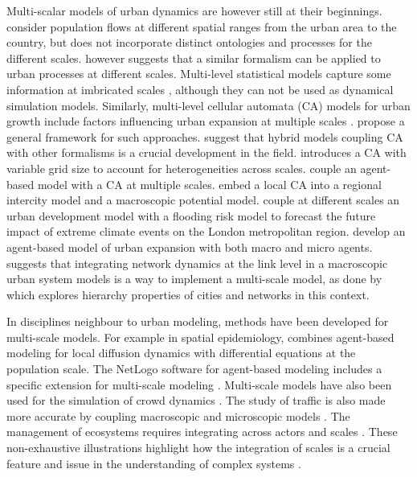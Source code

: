 \documentclass[11pt]{article}
\begin{document}

Multi-scalar models of urban dynamics are however still at their beginnings. \cite{murcio2015urban} consider population flows at different spatial ranges from the urban area to the country, but does not incorporate distinct ontologies and processes for the different scales. \cite{batty2005agents} however suggests that a similar formalism can be applied to urban processes at different scales. Multi-level statistical models capture some information at imbricated scales \cite{shu2020modelling}, although they can not be used as dynamical simulation models. Similarly, multi-level cellular automata (CA) models for urban growth include factors influencing urban expansion at multiple scales \cite{xu2019directional}. \cite{cheng2003modelling} propose a general framework for such approaches. \cite{torrens2001cellular} suggest that hybrid models coupling CA with other formalisms is a crucial development in the field. \cite{white2006modeling} introduces a CA with variable grid size to account for heterogeneities across scales. \cite{zhu2020dynamic} couple an agent-based model with a CA at multiple scales. \cite{yu2018modeling} embed a local CA into a regional intercity model and a macroscopic potential model. \cite{ford2019multi} couple at different scales an urban development model with a flooding risk model to forecast the future impact of extreme climate events on the London metropolitan region. \cite{xu2020urban} develop an agent-based model of urban expansion with both macro and micro agents. \cite{raimbault:halshs-02013006} suggests that integrating network dynamics at the link level in a macroscopic urban system models is a way to implement a multi-scale model, as done by \cite{raimbault2020hierarchy} which explores hierarchy properties of cities and networks in this context.

In disciplines neighbour to urban modeling, methods have been developed for multi-scale models. For example in spatial epidemiology, \cite{banos2015importance} combines agent-based modeling for local diffusion dynamics with differential equations at the population scale. The NetLogo software for agent-based modeling includes a specific extension for multi-scale modeling \cite{hjorth2020levelspace}. Multi-scale models have also been used for the simulation of crowd dynamics \cite{crociani2016multi}. The study of traffic is also made more accurate by coupling macroscopic and microscopic models \cite{boulet2020coupling}. The management of ecosystems  requires integrating across actors and scales \cite{belem2013organizational}. These non-exhaustive illustrations highlight how the integration of scales is a crucial feature and issue in the understanding of complex systems \cite{chavalarias2009french}.
\end{document}

